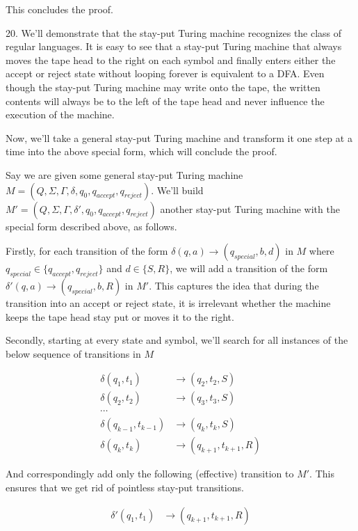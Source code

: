 \documentclass{article}
\begin{document}
This concludes the proof.

20. We'll demonstrate that the stay-put Turing machine recognizes the class of regular languages. It is easy to see that a stay-put Turing machine that always moves the tape head to the right on each symbol and finally enters either the accept or reject state without looping forever is equivalent to a DFA. Even though the stay-put Turing machine may write onto the tape, the written contents will always be to the left of the tape head and never influence the execution of the machine.

Now, we'll take a general stay-put Turing machine and transform it one step at a time into the above special form, which will conclude the proof.

Say we are given some general stay-put Turing machine $M = (Q, \Sigma, \Gamma, \delta, q_0, q_{accept}, q_{reject})$. We'll build $M' = (Q, \Sigma, \Gamma, \delta', q_0, q_{accept}, q_{reject})$ another stay-put Turing machine with the special form described above, as follows.

Firstly, for each transition of the form $\delta(q, a) \rightarrow (q_{special}, b, d)$ in $M$ where $q_{special} \in \{q_{accept}, q_{reject}\}$ and $d \in \{S, R\}$, we will add a transition of the form $\delta'(q, a) \rightarrow (q_{special}, b, R)$ in $M'$. This captures the idea that during the transition into an accept or reject state, it is irrelevant whether the machine keeps the tape head stay put or moves it to the right.

Secondly, starting at every state and symbol, we'll search for all instances of the below sequence of transitions in $M$

\begin{align*}
    \delta(q_1, t_1)             & \rightarrow (q_2, t_2, S) \\
    \delta(q_2, t_2)             & \rightarrow (q_3, t_3, S) \\
    \cdots \\
    \delta(q_{k - 1}, t_{k - 1}) & \rightarrow (q_k, t_k, S) \\
    \delta(q_k, t_k)             & \rightarrow (q_{k + 1}, t_{k + 1}, R)
\end{align*}

And correspondingly add only the following (effective) transition to $M'$. This ensures that we get rid of pointless stay-put transitions.

\begin{align*}
    \delta'(q_1, t_1) & \rightarrow (q_{k + 1}, t_{k + 1}, R)
\end{align*}
\end{document}
